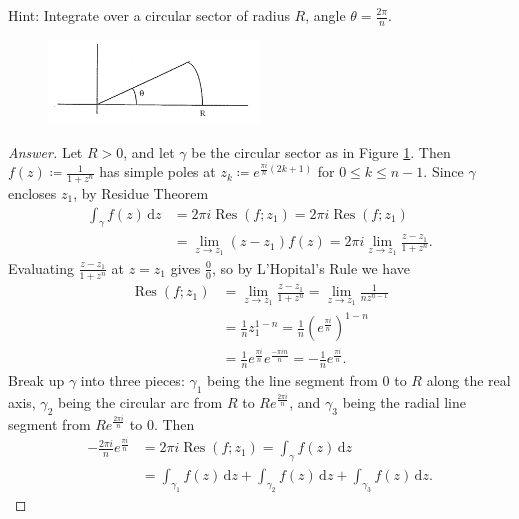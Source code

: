 \documentclass[12pt]{article}
\newcommand\paren[1]{\left( #1 \right)}
\theoremstyle{definition}
\DeclareMathOperator\Res{Res}
\begin{document}
Hint: Integrate over a circular sector of radius $R$, angle $\theta = \frac{2\pi}{n}$.
\begin{figure}[H]
    \centering
    \includegraphics[width = 0.5\textwidth]{10.png}
    \caption{}
    \label{fig:fig10}
\end{figure}
\begin{proof}[Answer]
    Let $R > 0$, and let $\gamma$ be the circular sector as in Figure \ref{fig:fig10}. Then $f(z) \coloneqq \frac{1}{1+z^n}$ has simple poles at $z_k \coloneqq e^{\frac{\pi i}{n}(2k+1)}$ for $0 \leq k \leq n-1$. Since $\gamma$ encloses $z_1$, by Residue Theorem
    \begin{align*}
        \int_{\gamma} f(z) \, \mathrm{d}z & = 2\pi i \Res \paren{ f ; z_1 } = 2\pi i \Res \paren{ f ; z_1 } \\
        & = \lim\limits_{z \to z_1} \paren{ z - z_1 } f(z) = 2\pi i \lim\limits_{z \to z_1} \frac{z - z_1}{1 + z^n}.
    \end{align*}
    Evaluating $\frac{z - z_1}{1 + z^n}$ at $z = z_1$ gives $\frac{0}{0}$, so by L'Hopital's Rule we have
    \begin{align*}
        \Res \paren{ f ; z_1 } & = \lim\limits_{z \to z_1} \frac{z - z_1}{1 + z^n} = \lim\limits_{z \to z_1} \frac{1}{n z^{n-1}} \\
        & = \frac{1}{n} z_1^{1-n} = \frac{1}{n} \paren{ e^{\frac{\pi i}{n} } }^{1-n} \\
        & = \frac{1}{n} e^{\frac{\pi i}{n}} e^{\frac{-\pi in}{n}} = -\frac{1}{n} e^{\frac{\pi i}{n}}.
    \end{align*}
    Break up $\gamma$ into three pieces: $\gamma_1$ being the line segment from $0$ to $R$ along the real axis, $\gamma_2$ being the circular arc from $R$ to $Re^{\frac{2\pi i}{n}}$, and $\gamma_3$ being the radial line segment from $Re^{\frac{2\pi i}{n}}$ to $0$. Then
    \begin{align*}
        -\frac{2\pi i}{n} e^{\frac{\pi i}{n}} & = 2\pi i \Res \paren{ f ; z_1 } = \int_{\gamma} f(z) \, \mathrm{d}z \\
        & = \int_{\gamma_1} f(z) \, \mathrm{d}z + \int_{\gamma_2} f(z) \, \mathrm{d}z + \int_{\gamma_3} f(z) \, \mathrm{d}z.
    \end{align*}

\end{proof}
\end{document}
